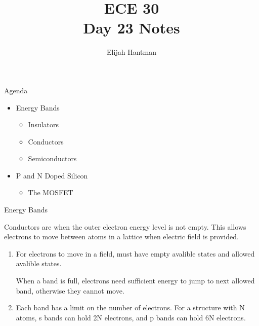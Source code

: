 \documentclass{report}
\title{\Huge{ECE 30}\\Day 23 Notes}
\author{\huge{Elijah Hantman}}
\date{}
\begin{document}
\maketitle
\newpage

\begin{description}
    \item {\large Agenda} 
        \begin{itemize}
            \item Energy Bands
                \begin{itemize}
                    \item Insulators
                    \item Conductors
                    \item Semiconductors
                \end{itemize}
            \item P and N Doped Silicon
                \begin{itemize}
                    \item The MOSFET
                \end{itemize}
        \end{itemize}

    \item Energy Bands
        \begin{mdframed}
            Conductors are when the outer electron
            energy level is not empty.
            This allows electrons to move between
            atoms in a lattice when electric field
            is provided.
        \end{mdframed}
        \begin{mdframed}
            \begin{enumerate}
                \item For electrons to move in a field,
                    must have empty avalible states
                    and allowed avalible states.

                    When a band is full, electrons need
                    sufficient energy to jump to next
                    allowed band, otherwise they
                    cannot move.
                \item Each band has a limit on the number
                    of electrons. For a structure with
                    N atoms, s bands can hold 2N electrons,
                    and p bands can hold 6N electrons.
            \end{enumerate}


\end{mdframed}
\end{description}
\end{document}
